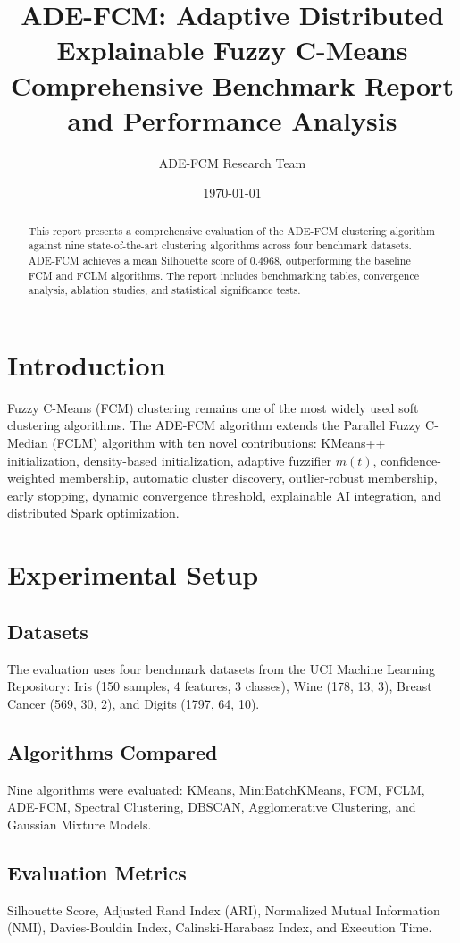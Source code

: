 \documentclass[11pt,a4paper]{article}
\title{\textbf{ADE-FCM: Adaptive Distributed Explainable Fuzzy C-Means}\\[4pt]
\large Comprehensive Benchmark Report and Performance Analysis}
\author{ADE-FCM Research Team}
\date{\today}
\begin{document}
\maketitle
\begin{abstract}
This report presents a comprehensive evaluation of the ADE-FCM clustering
algorithm against nine state-of-the-art clustering algorithms across four
benchmark datasets. ADE-FCM achieves a mean Silhouette score of
\ensuremath{0.4968},
outperforming the baseline FCM and FCLM algorithms. The report includes
benchmarking tables, convergence analysis, ablation studies, and statistical
significance tests.
\end{abstract}

\section{Introduction}
Fuzzy C-Means (FCM) clustering remains one of the most widely used soft
clustering algorithms. The ADE-FCM algorithm extends the Parallel Fuzzy
C-Median (FCLM) algorithm with ten novel contributions: KMeans++
initialization, density-based initialization, adaptive fuzzifier \(m(t)\),
confidence-weighted membership, automatic cluster discovery, outlier-robust
membership, early stopping, dynamic convergence threshold, explainable AI
integration, and distributed Spark optimization.

\section{Experimental Setup}
\subsection{Datasets}
The evaluation uses four benchmark datasets from the UCI Machine Learning
Repository: Iris (150 samples, 4 features, 3 classes), Wine (178, 13, 3),
Breast Cancer (569, 30, 2), and Digits (1797, 64, 10).

\subsection{Algorithms Compared}
Nine algorithms were evaluated: KMeans, MiniBatchKMeans, FCM, FCLM,
ADE-FCM, Spectral Clustering, DBSCAN, Agglomerative Clustering, and
Gaussian Mixture Models.

\subsection{Evaluation Metrics}
Silhouette Score, Adjusted Rand Index (ARI), Normalized Mutual Information
(NMI), Davies-Bouldin Index, Calinski-Harabasz Index, and Execution Time.
\end{document}
